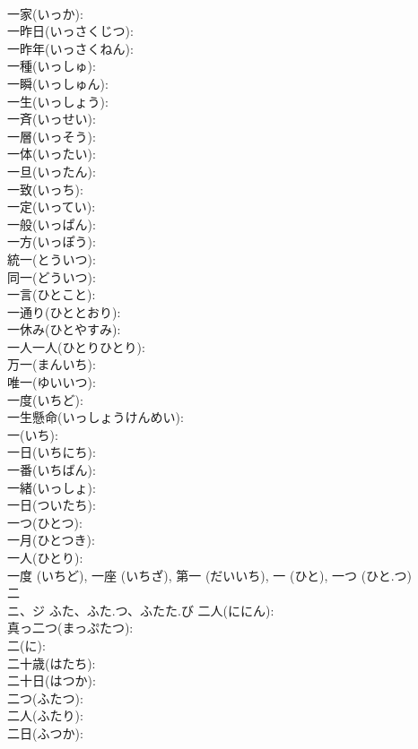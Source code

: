 \documentclass[8pt]{extreport}
\begin{document}
\begin{CJK}{UTF8}{min}
\\	一家(いっか): 
\\	一昨日(いっさくじつ): 
\\	一昨年(いっさくねん): 
\\	一種(いっしゅ): 
\\	一瞬(いっしゅん): 
\\	一生(いっしょう): 
\\	一斉(いっせい): 
\\	一層(いっそう): 
\\	一体(いったい): 
\\	一旦(いったん): 
\\	一致(いっち): 
\\	一定(いってい): 
\\	一般(いっぱん): 
\\	一方(いっぽう): 
\\	統一(とういつ): 
\\	同一(どういつ): 
\\	一言(ひとこと): 
\\	一通り(ひととおり): 
\\	一休み(ひとやすみ): 
\\	一人一人(ひとりひとり): 
\\	万一(まんいち): 
\\	唯一(ゆいいつ): 
\\	一度(いちど): 
\\	一生懸命(いっしょうけんめい): 
\\	一(いち): 
\\	一日(いちにち): 
\\	一番(いちばん): 
\\	一緒(いっしょ): 
\\	一日(ついたち): 
\\	一つ(ひとつ): 
\\	一月(ひとつき): 
\\	一人(ひとり): 
\\	一度 (いちど), 一座 (いちざ), 第一 (だいいち), 一 (ひと), 一つ (ひと.つ)
\\	二			
\\	ニ、ジ	ふた、ふた.つ、ふたた.び	二人(ににん): 
\\	真っ二つ(まっぷたつ): 
\\	二(に): 
\\	二十歳(はたち): 
\\	二十日(はつか): 
\\	二つ(ふたつ): 
\\	二人(ふたり): 
\\	二日(ふつか): 

\end{CJK}
\end{document}
